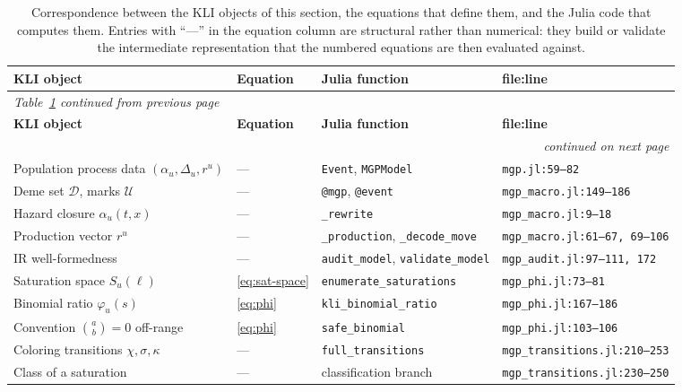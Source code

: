 \documentclass[11pt,leqno]{article}
\newcommand{\Jumps}{\mathcal{U}}    %
\newcommand{\Demes}{\mathcal{D}}    %
\newcommand{\code}[1]{\texttt{#1}}
\theoremstyle{plain}
\theoremstyle{definition}
\begin{document}
\footnotesize
\renewcommand{\arraystretch}{1.15}
\begin{longtable}{@{}p{}p{}p{}p{}@{}}
\caption{Correspondence between the KLI objects of this section, the
equations that define them, and the Julia code that computes them.  Entries
with ``---'' in the equation column are structural rather than numerical:
they build or validate the intermediate representation that the numbered
equations are then evaluated against.}
\label{tab:correspondence}\\
\toprule
\textbf{KLI object} & \textbf{Equation} & \textbf{Julia function} &
  \textbf{file:line} \\
\midrule
\endfirsthead
\multicolumn{4}{l}{\textit{Table~\ref{tab:correspondence} continued from previous page}}\\
\toprule
\textbf{KLI object} & \textbf{Equation} & \textbf{Julia function} &
  \textbf{file:line} \\
\midrule
\endhead
\midrule
\multicolumn{4}{r}{\textit{continued on next page}}\\
\endfoot
\bottomrule
\endlastfoot
Population process data $(\alpha_u,\Delta_u,r^u)$ & --- &
  \code{Event}, \code{MGPModel} & \code{mgp.jl:59--82} \\
Deme set $\Demes$, marks $\Jumps$ & --- &
  \code{@mgp}, \code{@event} & \code{mgp\_macro.jl:149--186} \\
Hazard closure $\alpha_u(t,x)$ & --- &
  \code{\_rewrite} & \code{mgp\_macro.jl:9--18} \\
Production vector $r^u$ & --- &
  \code{\_production}, \code{\_decode\_move} & \code{mgp\_macro.jl:61--67, 69--106} \\
IR well-formedness & --- &
  \code{audit\_model}, \code{validate\_model} & \code{mgp\_audit.jl:97--111, 172} \\
\addlinespace
Saturation space $S_u(\ell)$ & \eqref{eq:sat-space} &
  \code{enumerate\_saturations} & \code{mgp\_phi.jl:73--81} \\
Binomial ratio $\varphi_u(s)$ & \eqref{eq:phi} &
  \code{kli\_binomial\_ratio} & \code{mgp\_phi.jl:167--186} \\
Convention $\binom{a}{b}=0$ off-range & \eqref{eq:phi} &
  \code{safe\_binomial} & \code{mgp\_phi.jl:103--106} \\
\addlinespace
Coloring transitions $\chi,\sigma,\kappa$ & --- &
  \code{full\_transitions} & \code{mgp\_transitions.jl:210--253} \\
Class of a saturation & --- &
  classification branch & \code{mgp\_transitions.jl:230--250} \\

\end{longtable}
\end{document}
